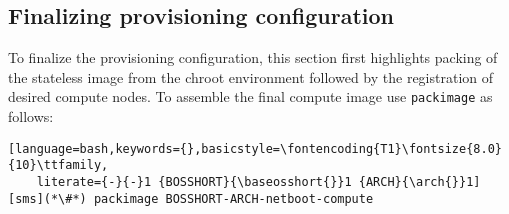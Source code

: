 \subsection{Finalizing provisioning configuration} \label{sec:assemble_bootstrap}

To finalize the \xCAT{} provisioning configuration, this section first highlights
packing of the stateless image from the chroot environment followed by the
registration of desired compute nodes. To assemble the final compute image use
\texttt{packimage} as follows:

\begin{lstlisting}[language=bash,keywords={},basicstyle=\fontencoding{T1}\fontsize{8.0}{10}\ttfamily,
    literate={-}{-}1 {BOSSHORT}{\baseosshort{}}1 {ARCH}{\arch{}}1]
[sms](*\#*) packimage BOSSHORT-ARCH-netboot-compute
\end{lstlisting}

